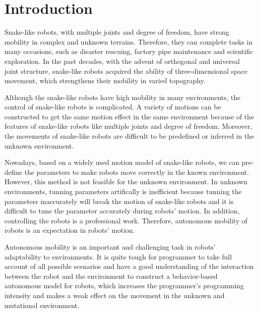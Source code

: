 \section{Introduction}
Snake-like robots, with multiple joints and degree of freedom, 
have strong mobility in complex and unknown terrains\cite{Chirikjian1995The}. 
Therefore, they can complete tasks in many occasions, such as disaster 
rescuing\cite{DogAndSnake}, factory pipe maintenance\cite{ACMTutorial} 
and scientific exploration\cite{Kuwada2007Snake}. In the past decades, 
with the advent of orthogonal and universal joint structure\cite{1014757}\cite{Date2005Control}\cite{GaitBasedCompliant}, 
snake-like robots acquired the ability of three-dimensional space movement, 
which strengthens their mobility in varied topography. 

Although the snake-like robots have high mobility in many environments, the control of snake-like robots is complicated. A variety of motions can be constructed to get the same motion effect in the same environment because of the features of snake-like robots like multiple joints and degree of freedom. Moreover, the movements of snake-like robots are difficult to be predefined or inferred in the unknown environment.

Nowadays, based on a widely used motion model\cite{HiroseSine} of snake-like robots, we can pre-define the parameters to make robots move correctly in the known environment. However, this method is not feasible for the unknown environment. In unknown environments, tunning parameters artifically is inefficient because tunning the parameters inaccurately will break the motion of snake-like robots and it is difficult to tune the parameter accurately during robots' motion. In addition, controlling the robots is a professional work. Therefore, autonomous mobility of robots is an expectation in robots' motion.

Autonomous mobility is an important and challenging task in robots' adaptability to environments. It is quite tough for programmer to take full account of all possible scenarios and have a good understanding of the interaction between the robot and the environment to construct a behavior-based autonomous model for robots, which increases the programmer's programming intensity and makes a weak effect on the movement in the unknown and mutational environment.

